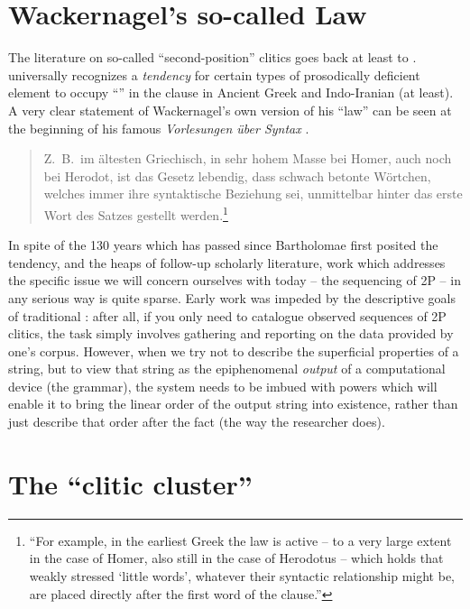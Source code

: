 \documentclass[output=paper,
modfonts
]{LSP/langsci}
\begin{document}
\section{Wackernagel's so-called Law}

The literature on so-called ``second-position'' clitics goes back at least to
\citet{bartholomae1886}.  universally recognizes a \textit{tendency} for certain types of prosodically
deficient element to occupy ``'' in the clause in Ancient Greek and
Indo-Iranian (at least). A very clear statement of Wackernagel's
own version of his ``law'' can be seen at the beginning of his famous \textit{Vorlesungen
über Syntax} \citep[7]{wackernagel1920}.
 

\begin{quote}
\noindent Z.\ B.\ im ältesten Griechisch, in sehr hohem Masse bei Homer,
auch noch bei Hero\-dot, ist das Gesetz lebendig, dass schwach betonte Wört\-chen,
welches immer ihre syntaktische Beziehung sei, unmittelbar hinter das
erste Wort des Satzes gestellt werden.\footnote{``For example, in the earliest Greek the law is active -- to a very
large extent in the case of Homer, also still in the case of Herodotus -- which holds that weakly stressed `little words', whatever their syntactic relationship might
be, are placed directly after the first word of the clause.''}
\end{quote}

\noindent In spite of the 130 years which has passed since Bartholomae first posited the tendency, 
and the heaps of follow-up scholarly literature, work which addresses the specific issue we will
concern ourselves with today -- the sequencing of 2P  -- in any serious way is quite sparse.
Early work was impeded by the descriptive goals of traditional : after all,
if you only need to catalogue observed sequences of 2P clitics, the task simply involves gathering
and reporting on the data provided by one's corpus. However, when we try not to describe the superficial 
properties of a string,
but to view that string as the epiphenomenal \textit{output} of a computational device (the grammar),
the system needs to be imbued with powers which will enable it to bring the linear
order of the output string into existence, rather than just describe that order after the fact (the way
the researcher does). 


\section{The ``clitic cluster''}
\end{document}
